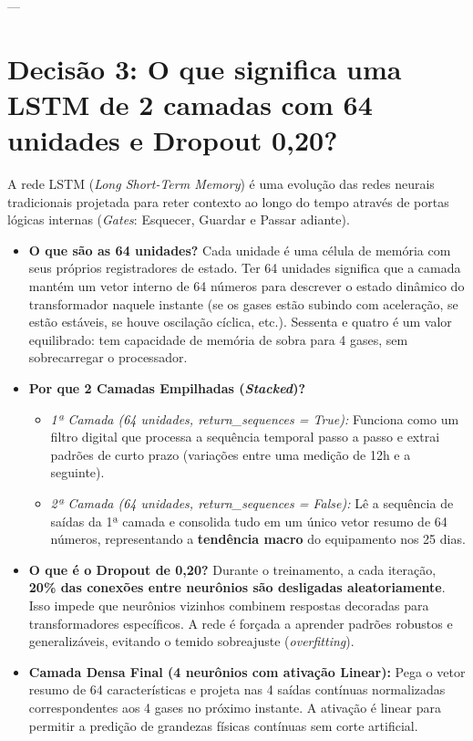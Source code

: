 \documentclass[10pt,a4paper]{article}
\begin{document}
---

\section{Decisão 3: O que significa uma LSTM de 2 camadas com 64 unidades e Dropout 0,20?}

\begin{conceitobox}
A rede LSTM (\textit{Long Short-Term Memory}) é uma evolução das redes neurais tradicionais projetada para reter contexto ao longo do tempo através de portas lógicas internas (\textit{Gates}: Esquecer, Guardar e Passar adiante).

\begin{itemize}[leftmargin=*,itemsep=2pt]
  \item \textbf{O que são as 64 unidades?} Cada unidade é uma célula de memória com seus próprios registradores de estado. Ter 64 unidades significa que a camada mantém um vetor interno de 64 números para descrever o estado dinâmico do transformador naquele instante (se os gases estão subindo com aceleração, se estão estáveis, se houve oscilação cíclica, etc.). Sessenta e quatro é um valor equilibrado: tem capacidade de memória de sobra para 4 gases, sem sobrecarregar o processador.
  \item \textbf{Por que 2 Camadas Empilhadas (\textit{Stacked})?}
    \begin{itemize}[leftmargin=*,itemsep=1pt]
      \item \textit{1ª Camada (64 unidades, return\_sequences = True):} Funciona como um filtro digital que processa a sequência temporal passo a passo e extrai padrões de curto prazo (variações entre uma medição de 12h e a seguinte).
      \item \textit{2ª Camada (64 unidades, return\_sequences = False):} Lê a sequência de saídas da 1ª camada e consolida tudo em um único vetor resumo de 64 números, representando a \textbf{tendência macro} do equipamento nos 25 dias.
    \end{itemize}
  \item \textbf{O que é o Dropout de 0,20?} Durante o treinamento, a cada iteração, \textbf{20\% das conexões entre neurônios são desligadas aleatoriamente}. Isso impede que neurônios vizinhos combinem respostas decoradas para transformadores específicos. A rede é forçada a aprender padrões robustos e generalizáveis, evitando o temido sobreajuste (\textit{overfitting}).
  \item \textbf{Camada Densa Final (4 neurônios com ativação Linear):} Pega o vetor resumo de 64 características e projeta nas 4 saídas contínuas normalizadas correspondentes aos 4 gases no próximo instante. A ativação é linear para permitir a predição de grandezas físicas contínuas sem corte artificial.
\end{itemize}
\end{conceitobox}
\end{document}
